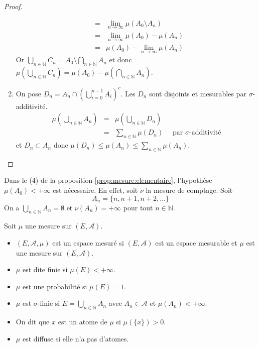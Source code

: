 \begin{proof}
\begin{enumerate}
\begin{eqnarray*}
			      &=& \lim\limits_{n \to \infty} \mu(A_0\setminus A_n) \\
			      &=& \lim\limits_{n \to \infty} \mu(A_0) - \mu(A_n) \\
			      &=& \mu(A_0) - \lim\limits_{n \to \infty} \mu(A_n)
		      \end{eqnarray*}
		      Or $\bigcup\limits_{n \in \mathbb{N}} C_n = A_0 \setminus \bigcap\limits_{n \in \mathbb{N}} A_n$ et donc
		      $\mu(\bigcup\limits_{n \in \mathbb{N}} C_n) = \mu(A_0) - \mu(\bigcap\limits_{n \in \mathbb{N}} A_n)$.
		\item On pose $D_n = A_n \cap \left( \bigcup\limits_{i=0}^{n-1} A_i \right)^c$. Les $D_n$ sont disjoints et mesurables par
		      $\sigma$-additivité.
		      \begin{eqnarray*}
			      \mu(\bigcup\limits_{n \in \mathbb{N}} A_n) &=& \mu(\bigcup\limits_{n \in \mathbb{N}} D_n) \\
			      &=& \sum\limits_{n \in \mathbb{N}} \mu(D_n) \quad \text{ par } \sigma\text{-additivité}
		      \end{eqnarray*}
		      et $D_n \subset A_n$ donc $\mu(D_n) \leq \mu(A_n) \leq \sum\limits_{n \in \mathbb{N}} \mu(A_n)$.
	\end{enumerate}
\end{proof}

\begin{remarque}
	Dans le (4) de la proposition \ref{prop:mesure:elementaire}, l'hypothèse $\mu(A_0) < +\infty$ est nécessaire. En effet, soit
	$\nu$ la mesure de comptage. Soit
	\[ A_n = \{ n, n+1, n+2, \dots \} \]
	On a $\bigcup\limits_{n \in \mathbb{N}} A_n = \emptyset$ et $\nu(A_n) = +\infty$ pour tout $n \in \mathbb{N}$.
\end{remarque}

\begin{definition}
	Soit $\mu$ une mesure sur $(E, \mathscr{A})$.
	\begin{itemize}
		\item $(E, \mathscr{A}, \mu)$ est un espace mesuré si $(E,\mathscr{A})$ est un espace mesurable et $\mu$ est une mesure sur $ (E, \mathscr{A} ) $.
		\item $\mu$ est dite finie si $\mu(E) < +\infty$.
		\item $\mu$ est une probabilité si $\mu(E) = 1$.
		\item $\mu$ est $\sigma$-finie si $E = \bigcup\limits_{n \in \mathbb{N}} A_n$ avec $A_n \in \mathscr{A}$ et $\mu(A_n) < +\infty$.
		\item On dit que $x$ est un atome de $\mu$ si $\mu(\{x\}) > 0$.
		\item $\mu$ est diffuse si elle n'a pas d'atomes.
	\end{itemize}
\end{definition}
